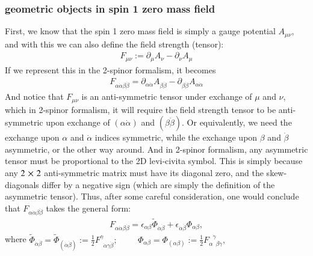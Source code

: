\documentclass{article}
\begin{document}
  \subsubsection{geometric objects in spin 1 zero mass field}%
    \label{sub: objects in spin 1 zero mass field}
    First, we know that the spin 1 zero mass field is simply a gauge
    potential $ A_{\mu \nu} $, and with this we can also define
    the field strength (tensor): 
    \begin{align}
      \label{field strength definiton}
       F_{\mu \nu} := \partial_{\mu} A_{\nu} -
    \partial_{\nu} A_{\mu}
    \end{align} 
  If we represent this in the 2-spinor formalism, it becomes
  \begin{align}
    \label{2-spinor field strength}
    F_{\alpha \dot{\alpha} \beta \dot{\beta} } = \partial_{\alpha
    \dot{\alpha}} A_{\beta \dot{\beta}} - \partial_{\beta
    \dot{\beta}} A_{\alpha \dot{\alpha}} 
  \end{align}
 And notice that $ F_{\mu \nu} $ is an anti-symmetric tensor under
 exchange of $ \mu   $ and $ \nu $, which in 2-spinor formalism,
 it will require the field strength tensor to be anti-symmetric upon
 exchange of $ (\alpha \dot{\alpha}) $ and $ (\beta
 \dot{\beta})$. Or equivalently, we need the exchange upon $ \alpha $
 and $ \dot{\alpha}$ indices symmetric, while the exchange upon $ \beta $ and
 $ \dot{\beta} $ asymmetric, or the other way around. And in 2-spinor
 formalism, any asymmetric tensor must be proportional to the 2D levi-civita
 symbol. This is simply because any $ 2 \cross 2 $ anti-symmetric matrix must have
 its diagonal zero, and the skew-diagonals differ by a negative sign (which
 are simply the definition of the asymmetric tensor). Thus, after some
 careful consideration, one would conclude that $ F_{\alpha \dot{\alpha}
 \beta \dot{\beta} }  $ takes the general form:
 \begin{align}
  \label{field strength dual form}
   F_{\alpha \dot{\alpha} \beta \dot{\beta} }  = 
   \epsilon_{\alpha \beta} \tilde \Phi_{\dot{\alpha} \dot{\beta}} +
   \epsilon_{\dot{\alpha} \dot{\beta}} \Phi_{\alpha \beta}, 
 \end{align}
where $ \tilde \Phi_{\dot{\alpha} \dot{\beta}} = \tilde
\Phi_{(\dot{\alpha} \dot{\beta})} :=
\frac{1}{2}F^{\gamma}_{\phantom{\gamma}\dot{\alpha} \gamma \dot{\beta}}; \hspace{1cm}
\Phi_{\alpha \beta} = \Phi_{(\alpha \beta)} := \frac{1}{2}
F_{\alpha \phantom{\dot{\gamma}} \beta
\dot{\gamma}}^{ \phantom{\alpha} \dot{\gamma}}, $
\end{document}
